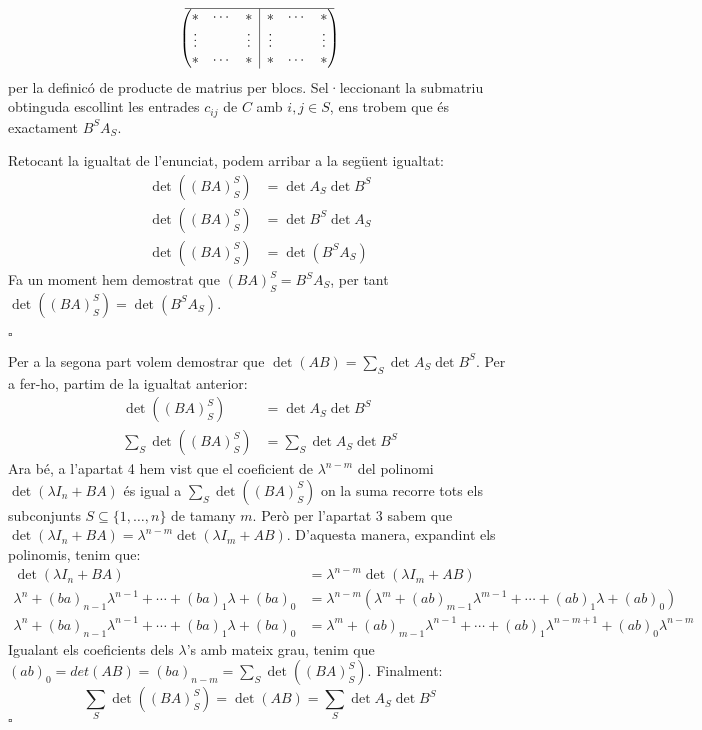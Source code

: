 \documentclass[11pt,a4paper]{article}
\newcommand*{\QED}{\hfill\ensuremath{\square}}
\newcommand{\rvline}{\hspace*{-\arraycolsep}\vline\hspace*{-\arraycolsep}}
\begin{document}
\begin{enumerate}
$$\begin{pmatrix}
    \hline
    \begin{matrix}
    \ast & \cdots & \ast \\
    \vdots & & \vdots \\
    \ast & \cdots & \ast
    \end{matrix} & \rvline & \begin{matrix}
    \ast & \cdots & \ast \\
    \vdots & & \vdots \\
    \ast & \cdots & \ast
    \end{matrix} \\
    \end{pmatrix}
   $$
   per la definicó de producte de matrius per blocs. Sel·leccionant la submatriu obtinguda escollint les entrades $c_{ij}$ de $C$ amb $i,j\in S$, ens trobem que és exactament $B^SA_S$.\par Retocant la igualtat de l'enunciat, podem arribar a la següent igualtat:
   \begin{align*}
       \det((BA)_S^S)&=\det A_S \det B^S \\
       \det((BA)_S^S)&=\det B^S\det A_S  \\
       \det((BA)_S^S)&=\det (B^SA_S)
   \end{align*}
   Fa un moment hem demostrat que $(BA)_S^S=B^SA_S$, per tant $\det((BA)_S^S)=\det (B^SA_S)$.\par\QED\par
   Per a la segona part volem demostrar que $\det (AB)=\sum_S \det A_S \det B^S$. Per a fer-ho, partim de la igualtat anterior:
   \begin{align*}
       \det((BA)_S^S)&=\det A_S \det B^S \\
       \sum_S\det((BA)_S^S)&=\sum_S\det A_S \det B^S
   \end{align*}
   Ara bé, a l'apartat 4 hem vist que el coeficient de $\lambda^{n-m}$ del polinomi $\det(\lambda I_n+BA)$ és igual a $\sum_S\det((BA)_S^S)$ on la suma recorre tots els subconjunts $S\subseteq \{1,\ldots,n\}$ de tamany $m$. Però per l'apartat 3 sabem que $\det(\lambda I_n+BA)=\lambda^{n-m}\det(\lambda I_m+AB)$. D'aquesta manera, expandint els polinomis, tenim que:
   \begin{align*}
    \det(\lambda I_n+BA)&=\lambda^{n-m}\det(\lambda I_m+AB) \\
       \lambda^n+(ba)_{n-1}\lambda^{n-1}+\cdots+(ba)_1\lambda+(ba)_0&=\lambda^{n-m}(\lambda^m+(ab)_{m-1}\lambda^{m-1}+\cdots+(ab)_1\lambda+(ab)_0) \\
       \lambda^n+(ba)_{n-1}\lambda^{n-1}+\cdots+(ba)_1\lambda+(ba)_0&=\lambda^m+(ab)_{m-1}\lambda^{n-1}+\cdots+(ab)_1\lambda^{n-m+1}+(ab)_0\lambda^{n-m}
   \end{align*}
   Igualant els coeficients dels $\lambda$'s amb mateix grau, tenim que $(ab)_0=det(AB)=(ba)_{n-m}=\sum_S\det((BA)_S^S)$. Finalment: $$\sum_S\det((BA)_S^S)=\det(AB)=\sum_S\det A_S \det B^S$$\QED
\end{enumerate}
\end{document}
